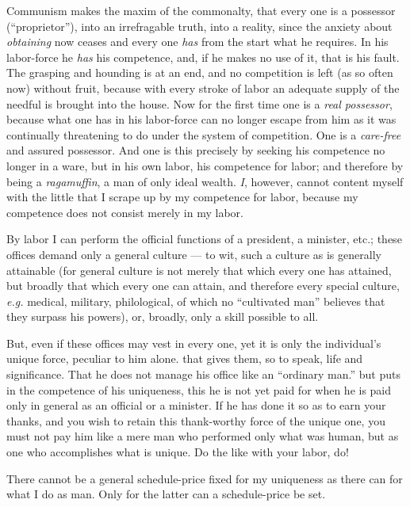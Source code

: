 Communism makes the maxim of the commonalty, that every one is a possessor 
(``proprietor''), into an irrefragable truth, into a reality, since the 
anxiety about \textit{obtaining} now ceases and every one \textit{has} from 
the start what he requires. In his labor-force he \textit{has} his competence, 
and, if he makes no use of it, that is his fault. The grasping and hounding is 
at an end, and no competition is left (as so often now) without fruit, because 
with every stroke of labor an adequate supply of the needful is brought into 
the house. Now for the first time one is a \textit{real possessor}, because 
what one has in his labor-force can no longer escape from him as it was 
continually threatening to do under the system of competition. One is a 
\textit{care-free} and assured possessor. And one is this precisely by seeking 
his competence no longer in a ware, but in his own labor, his competence for 
labor; and therefore by being a \textit{ragamuffin}, a man of only ideal 
wealth. \textit{I}, however, cannot content myself with the little that I 
scrape up by my competence for labor, because my competence does not consist 
merely in my labor.

By labor I can perform the official functions of a president, a minister, 
etc.; these offices demand only a general culture --- to wit, such a culture as 
is generally attainable (for general culture is not merely that which every 
one has attained, but broadly that which every one can attain, and therefore 
every special culture, \textit{e.g.} medical, military, philological, of 
which no ``cultivated man'' believes that they surpass his powers), or, 
broadly, only a skill possible to all.

But, even if these offices may vest in every one, yet it is only the 
individual's unique force, peculiar to him alone. that gives them, so to 
speak, life and significance. That he does not manage his office like an 
``ordinary man.'' but puts in the competence of his uniqueness, this he is 
not yet paid for when he is paid only in general as an official or a minister. 
If he has done it so as to earn your thanks, and you wish to retain this 
thank-worthy force of the unique one, you must not pay him like a mere man who 
performed only what was human, but as one who accomplishes what is unique. Do 
the like with your labor, do!

There cannot be a general schedule-price fixed for my uniqueness as there can 
for what I do as man. Only for the latter can a schedule-price be set.

